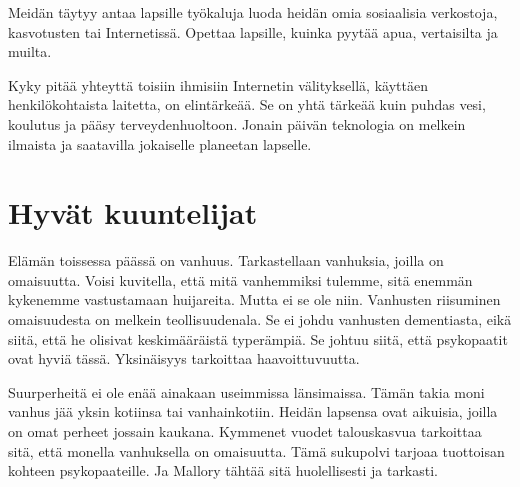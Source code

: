 Meidän täytyy antaa lapsille työkaluja luoda heidän omia sosiaalisia verkostoja, kasvotusten tai Internetissä. Opettaa lapsille, kuinka pyytää apua, vertaisilta ja muilta.

Kyky pitää yhteyttä toisiin ihmisiin Internetin välityksellä, käyttäen henkilökohtaista laitetta, on elintärkeää. Se on yhtä tärkeää kuin puhdas vesi, koulutus ja pääsy terveydenhuoltoon. Jonain päivän teknologia on melkein ilmaista ja saatavilla jokaiselle planeetan lapselle.

\section{Hyvät kuuntelijat}

Elämän toissessa päässä on vanhuus. Tarkastellaan vanhuksia, joilla on omaisuutta. Voisi kuvitella, että mitä vanhemmiksi tulemme, sitä enemmän kykenemme vastustamaan huijareita. Mutta ei se ole niin. Vanhusten riisuminen omaisuudesta on melkein teollisuudenala. Se ei johdu vanhusten dementiasta, eikä siitä, että he olisivat keskimääräistä typerämpiä. Se johtuu siitä, että psykopaatit ovat hyviä tässä. Yksinäisyys tarkoittaa haavoittuvuutta.

Suurperheitä ei ole enää ainakaan useimmissa länsimaissa. Tämän takia moni vanhus jää yksin kotiinsa tai vanhainkotiin. Heidän lapsensa ovat aikuisia, joilla on omat perheet jossain kaukana. Kymmenet vuodet talouskasvua tarkoittaa sitä, että monella vanhuksella on omaisuutta. Tämä sukupolvi tarjoaa tuottoisan kohteen psykopaateille. Ja Mallory tähtää sitä huolellisesti ja tarkasti.

